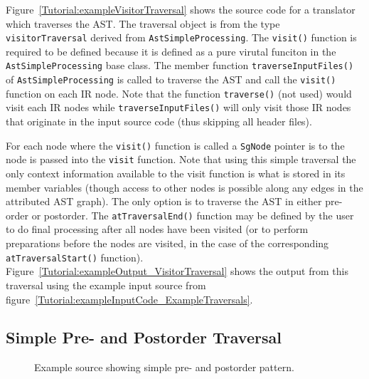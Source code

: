 Figure~\ref{Tutorial:exampleVisitorTraversal} shows the source code 
for a translator which traverses the AST.  The traversal object is
from the type {\tt visitorTraversal} derived from {\tt AstSimpleProcessing}.
The {\tt visit()} function is required to be defined because it is 
defined as a pure virutal funciton in the {\tt AstSimpleProcessing} base class.
The member function {\tt traverseInputFiles()} of {\tt AstSimpleProcessing} 
is called to traverse the AST and call the {\tt visit()} function on each
IR node.  Note that the function {\tt traverse()} (not used) would visit
each IR nodes while {\tt traverseInputFiles()} will only visit those
IR nodes that originate in the input source code (thus skipping all 
header files).

For each node where the {\tt visit()} function is called a {\tt SgNode} 
pointer is to the node is passed into the {\tt visit} function.
Note that using this simple traversal
the only context information available to the visit function is what is stored
in its member variables (though access to other nodes is possible along
any edges in the attributed AST graph).
The only option is to traverse the AST in either pre-order or postorder.
The {\tt atTraversalEnd()} function may be defined by the user to do final
processing after all nodes have been visited (or to perform preparations
before the nodes are visited, in the case of the corresponding {\tt
atTraversalStart()} function).
Figure~\ref{Tutorial:exampleOutput_VisitorTraversal} shows the 
output from this traversal using the example input source from 
figure~\ref{Tutorial:exampleInputCode_ExampleTraversals}.

\subsection{Simple Pre- and Postorder Traversal}

\begin{figure}[!h]
{\indent
{\mySmallFontSize

\begin{latexonly}
   
\end{latexonly}

\begin{htmlonly}
   
\end{htmlonly}

}
}
\caption{Example source showing simple pre- and postorder pattern.}
\label{Tutorial:examplePrePostTraversal}
\end{figure}


